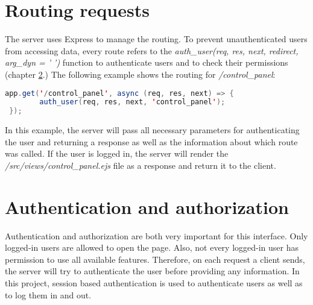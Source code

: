 
\section{Routing requests}
\label{sec:routing}

The server uses Express to manage the routing. To prevent unauthenticated users from accessing data, every route refers to the \textit{auth\_user(req, res, next, redirect, arg\_dyn = ' ')} function to authenticate users and to check their permissions (chapter \ref{sec:authentication_and_authorization}.) The following example shows the routing for \textit{/control\_panel}:

\begin{lstlisting}[language = Java, numbers = none]
 app.get('/control_panel', async (req, res, next) => {
 		auth_user(req, res, next, 'control_panel');
 });
\end{lstlisting}

In this example, the server will pass all necessary parameters for authenticating the user and returning a response as well as the information about which route was called. If the user is logged in, the server will render the \textit{/src/views/control\_panel.ejs} file as a response and return it to the client.





\section{Authentication and authorization}
\label{sec:authentication_and_authorization}

Authentication and authorization are both very important for this interface. Only logged-in users are allowed to open the page. Also, not every logged-in user has permission to use all available features. Therefore, on each request a client sends, the server will try to authenticate the user before providing any information. In this project, session based authentication is used to authenticate users as well as to log them in and out.\\



